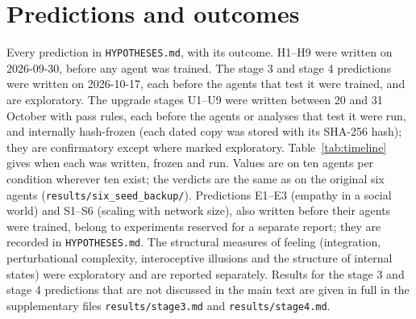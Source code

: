 \section{Predictions and outcomes}
\label{app:outcomes}

Every prediction in \texttt{HYPOTHESES.md}, with its outcome. H1--H9 were written on 2026-09-30, before any agent was trained. The stage 3 and stage 4 predictions were written on 2026-10-17, each before the agents that test it were trained, and are exploratory. The upgrade stages U1--U9 were written between 20 and 31 October with pass rules, each before the agents or analyses that test it were run, and internally hash-frozen (each dated copy was stored with its SHA-256 hash); they are confirmatory except where marked exploratory. Table~\ref{tab:timeline} gives when each was written, frozen and run. Values are on ten agents per condition wherever ten exist; the verdicts are the same as on the original six agents (\texttt{results/six\_seed\_backup/}). Predictions E1--E3 (empathy in a social world) and S1--S6 (scaling with network size), also written before their agents were trained, belong to experiments reserved for a separate report; they are recorded in \texttt{HYPOTHESES.md}. The structural measures of feeling (integration, perturbational complexity, interoceptive illusions and the structure of internal states) were exploratory and are reported separately. Results for the stage 3 and stage 4 predictions that are not discussed in the main text are given in full in the supplementary files \texttt{results/stage3.md} and \texttt{results/stage4.md}.

